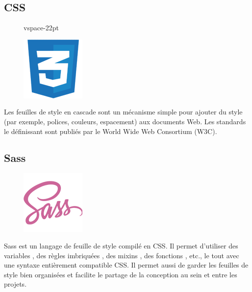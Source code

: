 \subsection{CSS}
    \begin{figure}
        vspace{-22pt}
        \begin{center}
            \includegraphics[scale=0.36]{images/logo/css.png}
            \label{fig71}
        \end{center}
        \vspace{-20pt}
        \vspace{-10pt}
    \end{figure}

Les feuilles de style en cascade sont un mécanisme simple pour ajouter du style 
(par exemple, polices, couleurs, espacement) aux documents Web. Les standards le 
définissant sont publiés par le World Wide Web Consortium (W3C)\cite{15}.
    
\subsection{Sass}
    \begin{figure}
        \vspace{-22pt}
        \begin{center}
            \includegraphics[scale=0.36]{images/logo/sass.png}
            \label{fig72}
        \end{center}
        \vspace{-20pt}
        \vspace{-10pt}
    \end{figure}

Sass est un langage de feuille de style compilé en CSS. Il permet d'utiliser des 
variables , des règles imbriquées , des mixins , des fonctions , etc., le tout 
avec une syntaxe entièrement compatible CSS. Il permet aussi de garder les 
feuilles de style bien organisées et facilite le partage de la conception au 
sein et entre les projets\cite{46}.


